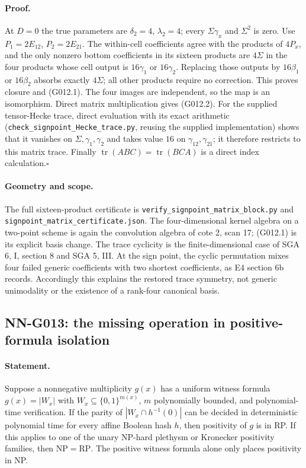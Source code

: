 \paragraph{Proof.}
At $D=0$ the true parameters are $\delta_2=4$,
$\lambda_2=4$; every $\Sigma\gamma_x$ and $\Sigma^2$ is zero.
Use $P_1=2E_{12}$, $P_2=2E_{21}$. The within-cell
coefficients agree with the products of $4P_x$, and the
only nonzero bottom coefficients in its sixteen products
are $4\Sigma$ in the four products whose cell output is
$16\gamma_1$ or $16\gamma_2$. Replacing those outputs by
$16\beta_1$ or $16\beta_2$ absorbs exactly $4\Sigma$;
all other products require no correction. This proves closure
and (G012.1). The four images are independent, so the map is
an isomorphism. Direct matrix multiplication gives (G012.2).
For the supplied tensor-Hecke trace, direct evaluation
with its exact arithmetic (\texttt{check\_signpoint\_Hecke\_trace.py},
reusing the supplied implementation) shows that it vanishes on $\Sigma,\gamma_1,
\gamma_2$ and takes value $16$ on $\gamma_{12},\gamma_{21}$;
it therefore restricts to this matrix trace. Finally
$\operatorname{tr}(ABC)=\operatorname{tr}(BCA)$ is a direct
index calculation.\hfill$\square$

\paragraph{Geometry and scope.}
The full sixteen-product certificate is
\texttt{verify\_signpoint\_matrix\_block.py} and
\texttt{signpoint\_matrix\_certificate.json}. The four-dimensional
kernel algebra on a two-point scheme is again the convolution
algebra of cote 2, scan 17; (G012.1) is its explicit basis change.
The trace cyclicity is the finite-dimensional case of SGA 6,
I, section 8 and SGA 5, III. At the sign point, the cyclic
permutation mixes four failed generic coefficients with two
shortest coefficients, as E4 section 6b records. Accordingly
this explains the restored trace symmetry, not generic
unimodality or the existence of a rank-four canonical basis.

\subsection{NN-G013: the missing operation in positive-formula isolation}
\paragraph{Statement.}
Suppose a nonnegative multiplicity $g(x)$ has a uniform witness
formula $g(x)=|W_x|$ with $W_x\subseteq\{0,1\}^{m(x)}$,
$m$ polynomially bounded, and polynomial-time verification.
If the parity of $|W_x\cap h^{-1}(0)|$ can be decided in
deterministic polynomial time for every affine Boolean hash
$h$, then positivity of $g$ is in RP. If this applies to one
of the unary NP-hard plethysm or Kronecker positivity families,
then $\mathrm{NP}=\mathrm{RP}$. The positive witness formula
alone only places positivity in NP.

